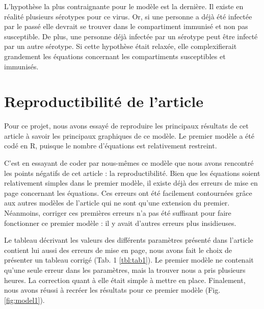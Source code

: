 \documentclass[
  12pt,
  french,
  oneside]{article}
\begin{document}
L'hypothèse la plus contraignante pour le modèle est la dernière. Il
existe en réalité plusieurs sérotypes pour ce virus. Or, si une personne
a déjà été infectée par le passé elle devrait se trouver dans le
compartiment immunisé et non pas susceptible. De plus, une personne déjà
infectée par un sérotype peut être infecté par un autre sérotype. Si
cette hypothèse était relaxée, elle complexifierait grandement les
équations concernant les compartiments susceptibles et immunisés.

\hypertarget{reproductibilituxe9-de-larticle}{%
\section{Reproductibilité de
l'article}\label{reproductibilituxe9-de-larticle}}

Pour ce projet, nous avons essayé de reproduire les principaux résultats
de cet article à savoir les principaux graphiques de ce modèle. Le
premier modèle a été codé en R, puisque le nombre d'équations est
relativement restreint.

C'est en essayant de coder par nous-mêmes ce modèle que nous avons
rencontré les points négatifs de cet article : la reproductibilité. Bien
que les équations soient relativement simples dans le premier modèle, il
existe déjà des erreurs de mise en page concernant les équations. Ces
erreurs ont été facilement contournées grâce aux autres modèles de
l'article qui ne sont qu'une extension du premier. Néanmoins, corriger
ces premières erreurs n'a pas été suffisant pour faire fonctionner ce
premier modèle : il y avait d'autres erreurs plus insidieuses.

Le tableau décrivant les valeurs des différents paramètres présenté dans
l'article contient lui aussi des erreurs de mise en page, nous avons
fait le choix de présenter un tableau corrigé (Tab. 1 \ref{tbl:tab1}).
Le premier modèle ne contenait qu'une seule erreur dans les paramètres,
mais la trouver nous a pris plusieurs heures. La correction quant à elle
était simple à mettre en place. Finalement, nous avons réussi à recréer
les résultats pour ce premier modèle (Fig. \ref{fig:model1}).
\end{document}
